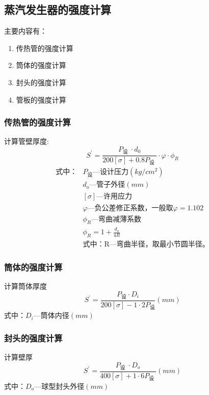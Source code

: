 \subsection{蒸汽发生器的强度计算}
主要内容有：
\begin{enumerate}
    \item 传热管的强度计算
    \item 筒体的强度计算
    \item 封头的强度计算
    \item 管板的强度计算
\end{enumerate}

\subsubsection{传热管的强度计算}
计算管壁厚度:
\begin{equation*}
    S^{\prime}=\frac{P_{\text {设 }} \cdot d_{0}}{200[\sigma]+0.8 P_{\text {设 }}} \cdot \varphi \cdot \phi_{R}
\end{equation*}
\begin{align*}
    \text{式中：} & P_{\text{设}} \text{—设计压力} (kg/cm^2)               \\
                  & d_o \text{—管子外径} (mm)                              \\
                  & [\sigma] \text{—许用应力}                              \\
                  & \varphi \text{—负公差修正系数，一般取} \varphi = 1.102 \\
                  & \phi_R \text{—弯曲减薄系数}                            \\
                  & \phi_{R}=1+\frac{d_{o}}{4 R}                           \\
                  & \text{式中：R—弯曲半径，取最小节圆半径。}
\end{align*}

\subsubsection{筒体的强度计算}
计算筒体厚度
\begin{equation*}
    S^{\prime}=\frac{P_{\text {设}} \cdot D_{i}}{200[\sigma]-1 \cdot 2 P_{\text {设}}} (mm)
\end{equation*}
式中：$D_i$—筒体内径$ (mm) $

\subsubsection{封头的强度计算}
计算壁厚
\begin{equation*}
    S^{\prime}=\frac{P_{\text {设 }} \cdot D_{o}}{400[\sigma]+1 \cdot 6 P_{\text {设 }}} (mm)
\end{equation*}
式中：$ D_o $—球型封头外径$ (mm) $

